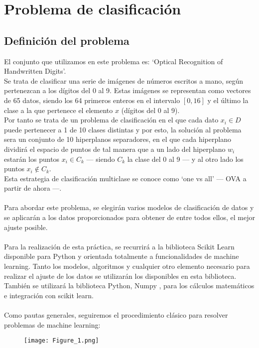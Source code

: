 \chapter{Problema de clasificación}
\section{Definición del problema}
El conjunto que utilizamos en este problema es: `Optical Recognition of Handwritten Digits'. \cite{Optical}\\
Se trata de clasificar una serie de imágenes de números escritos a mano, según pertenezcan a los dígitos del 0 al 9. Estas imágenes se representan como vectores de 65 datos, siendo los 64 primeros enteros en el intervalo $[0,16]$ y el último la clase a la que pertenece el elemento $x$ (dígitos del 0 al 9).\\
Por tanto se trata de un problema de clasificación en el que cada dato $x_i \in D$ puede pertenecer a 1 de 10 clases distintas y por esto, la solución al problema sera un conjunto de 10 hiperplanos separadores, en el que cada hiperplano dividirá el espacio de puntos de tal manera que a un lado del hiperplano $w_i$ estarán los puntos $x_i \in C_k$ --- siendo $C_k$ la clase del 0 al 9 --- y al otro lado los puntos $x_i \notin C_k$.\\
Esta estrategia de clasificación multiclase se conoce como `one vs all' --- OVA a partir de ahora ---.
\\\\
Para abordar este problema, se elegirán varios modelos de clasificación de datos y se aplicarán a los datos proporcionados para obtener de entre todos ellos, el mejor ajuste posible.\\
\\
Para la realización de esta práctica, se recurrirá a la biblioteca Scikit Learn \cite{SkUG} \cite{SkAPI} disponible para Python y orientada totalmente a funcionalidades de machine learning. Tanto los modelos, algoritmos y cualquier otro elemento necesario para realizar el ajuste de los datos se utilizarán los disponibles en esta biblioteca. También se utilizará la biblioteca Python, Numpy \cite{Numpy}, para los cálculos matemáticos e integración con scikit learn.\\
\\
Como pautas generales, seguiremos el procedimiento clásico para resolver problemas de machine learning:

\begin{figure}[h]
   \centering
   \texttt{[image: Figure\_1.png]}
\end{figure}

